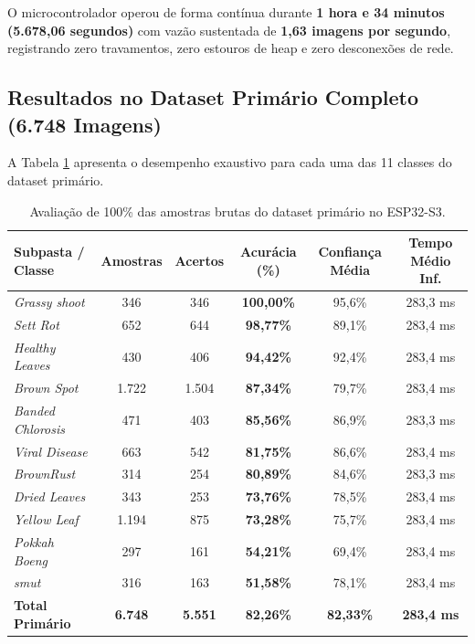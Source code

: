 O microcontrolador operou de forma contínua durante \textbf{1 hora e 34 minutos (5.678,06 segundos)} com vazão sustentada de \textbf{1,63 imagens por segundo}, registrando zero travamentos, zero estouros de heap e zero desconexões de rede.

\subsection{Resultados no Dataset Primário Completo (6.748 Imagens)}

A Tabela \ref{tab:dataset_completo_primario} apresenta o desempenho exaustivo para cada uma das 11 classes do dataset primário.

\begin{table}[H]
\centering
\small
\caption{Avaliação de 100\% das amostras brutas do dataset primário no ESP32-S3.}
\label{tab:dataset_completo_primario}
\begin{tabular}{lccccc}
\toprule
\textbf{Subpasta / Classe} & \textbf{Amostras} & \textbf{Acertos} & \textbf{Acurácia (\%)} & \textbf{Confiança Média} & \textbf{Tempo Médio Inf.} \\
\midrule
\textit{Grassy shoot}      & 346   & 346   & \textbf{100,00\%} & 95,6\% & 283,3 ms \\
\textit{Sett Rot}          & 652   & 644   & \textbf{98,77\%}  & 89,1\% & 283,4 ms \\
\textit{Healthy Leaves}    & 430   & 406   & \textbf{94,42\%}  & 92,4\% & 283,4 ms \\
\textit{Brown Spot}        & 1.722 & 1.504 & \textbf{87,34\%}  & 79,7\% & 283,4 ms \\
\textit{Banded Chlorosis}  & 471   & 403   & \textbf{85,56\%}  & 86,9\% & 283,3 ms \\
\textit{Viral Disease}     & 663   & 542   & \textbf{81,75\%}  & 86,6\% & 283,4 ms \\
\textit{BrownRust}         & 314   & 254   & \textbf{80,89\%}  & 84,6\% & 283,3 ms \\
\textit{Dried Leaves}      & 343   & 253   & \textbf{73,76\%}  & 78,5\% & 283,4 ms \\
\textit{Yellow Leaf}       & 1.194 & 875   & \textbf{73,28\%}  & 75,7\% & 283,4 ms \\
\textit{Pokkah Boeng}      & 297   & 161   & \textbf{54,21\%}  & 69,4\% & 283,4 ms \\
\textit{smut}              & 316   & 163   & \textbf{51,58\%}  & 78,1\% & 283,4 ms \\
\midrule
\textbf{Total Primário}    & \textbf{6.748} & \textbf{5.551} & \textbf{82,26\%} & \textbf{82,33\%} & \textbf{283,4 ms} \\
\bottomrule
\end{tabular}
\end{table}


